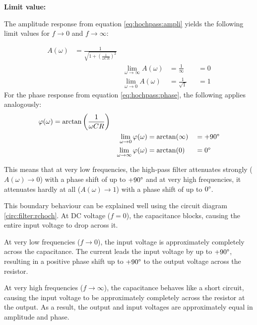 \begin{frame}
{    \textbf{Limit value:}

    The amplitude response from equation \ref{eq:hochpass:ampli} yields the following limit values 
    for $f \rightarrow 0$ and $f \rightarrow \infty$:
    
    \begin{align}
        &&A(\omega) &=\frac{1}{\sqrt{1 + \left(\frac{1}{\omega CR}\right)^2}}&  &                   &&          &&\nonumber\\
        &&          &&  \lim_{\omega \rightarrow \infty}A(\omega)               &=\frac{1}{\infty}  &&=0        &&\\
        &&          &&  \lim_{\omega \rightarrow 0}A(\omega)                    &=\frac{1}{\sqrt{1}}&&=1        &&\nonumber
    \end{align}
    For the phase response from equation \ref{eq:hochpass:phase}, the following applies analogously:
    \begin{align}
        &&\varphi(\omega)   &=\arctan\left(\frac{1}{\omega CR}\right)&          &                   &&          &&\nonumber\\
        &&          &&  \lim_{\omega \rightarrow 0}\varphi(\omega)              &=\arctan(\infty)   &&=+90\degree&&\\
        &&          &&  \lim_{\omega \rightarrow \infty}\varphi(\omega)          &=\arctan(0)        &&=0\degree &&\nonumber
    \end{align}

    This means that at very low frequencies, the high-pass filter attenuates strongly ($A(\omega) \rightarrow 0$) with a phase shift of up to $+90\degree$
    and at very high frequencies, it attenuates hardly at all ($A(\omega) \rightarrow 1$) with a phase shift of up to $0\degree$.
    
    This boundary behaviour can be explained well using the circuit diagram \ref{circ:filter:rchoch}.
    At DC voltage ($f=0$), the capacitance blocks, causing the entire input voltage to drop across it.
         
    At very low frequencies ($f \to 0$), the input voltage is approximately completely across the capacitance. 
    The current leads the input voltage by up to $+90\degree$, resulting in a positive phase shift 
    up to $+90\degree$ to the output voltage across the resistor.
    
    At very high frequencies ($f \rightarrow \infty$), the capacitance behaves like a short circuit, 
    causing the input voltage to be approximately completely across the resistor at the output.
    As a result, the output and input voltages are approximately equal in amplitude and phase.

}
\end{frame}
